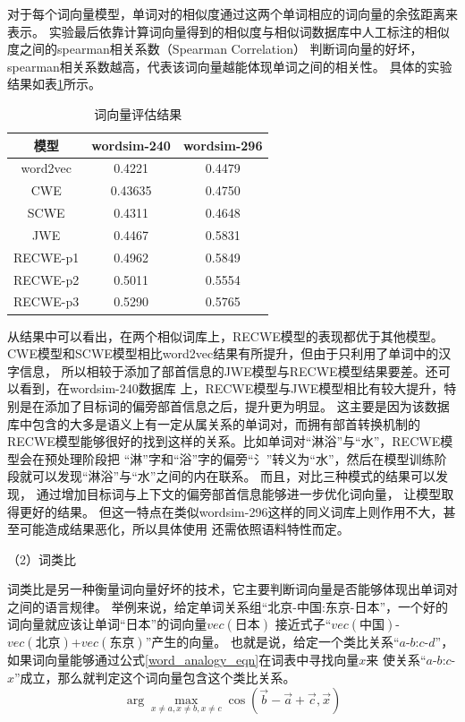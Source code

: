 对于每个词向量模型，单词对的相似度通过这两个单词相应的词向量的余弦距离来表示。
实验最后依靠计算词向量得到的相似度与相似词数据库中人工标注的相似度之间的spearman相关系数（Spearman Correlation）
判断词向量的好坏，spearman相关系数越高，代表该词向量越能体现单词之间的相关性。
具体的实验结果如表\ref{word_vec_result}所示。
\begin{table}[ht]
    \caption{词向量评估结果}
    \begin{tabular}{|c|c|c|}
        \hline
        模型 & wordsim-240 & wordsim-296 \\
        \hline
        word2vec & 0.4221 & 0.4479 \\
        \hline
        CWE & 0.43635 & 0.4750 \\
        \hline
        SCWE & 0.4311 & 0.4648 \\
        \hline
        JWE & 0.4467 & 0.5831 \\
        \hline
        RECWE-p1 & 0.4962 & 0.5849 \\
        \hline
        RECWE-p2 & 0.5011 & 0.5554 \\
        \hline
        RECWE-p3 & 0.5290 & 0.5765 \\
        \hline
    \end{tabular}
    \label{word_vec_result}
    \end{table}

从结果中可以看出，在两个相似词库上，RECWE模型的表现都优于其他模型。
CWE模型和SCWE模型相比word2vec结果有所提升，但由于只利用了单词中的汉字信息，
所以相较于添加了部首信息的JWE模型与RECWE模型结果要差。还可以看到，在wordsim-240数据库
上，RECWE模型与JWE模型相比有较大提升，特别是在添加了目标词的偏旁部首信息之后，提升更为明显。
这主要是因为该数据库中包含的大多是语义上有一定从属关系的单词对，而拥有部首转换机制的
RECWE模型能够很好的找到这样的关系。比如单词对“淋浴”与“水”，RECWE模型会在预处理阶段把
“淋”字和“浴”字的偏旁“氵”转义为“水”，然后在模型训练阶段就可以发现“淋浴”与“水”之间的内在联系。
而且，对比三种模式的结果可以发现，
通过增加目标词与上下文的偏旁部首信息能够进一步优化词向量，
让模型取得更好的结果。
但这一特点在类似wordsim-296这样的同义词库上则作用不大，甚至可能造成结果恶化，所以具体使用
还需依照语料特性而定。

（2）词类比

词类比是另一种衡量词向量好坏的技术，它主要判断词向量是否能够体现出单词对之间的语言规律。
举例来说，给定单词关系组“北京-中国:东京-日本”，一个好的词向量就应该让单词“日本”的词向量$vec\left(\mbox{日本}\right)$
接近式子“$vec\left(\mbox{中国}\right)$-$vec\left(\mbox{北京}\right)$+$vec\left(\mbox{东京}\right)$”产生的向量。
也就是说，给定一个类比关系“$a$-$b$:$c$-$d$”，如果词向量能够通过公式\ref{word_analogy_eqn}在词表中寻找向量$x$来
使关系“$a$-$b$:$c$-$x$”成立，那么就判定这个词向量包含这个类比关系。
\begin{equation}
    \arg \max_{x\neq a,x\neq b,x\neq c}\cos \left ( \vec{b}-\vec{a}+\vec{c},\vec{x} \right )
    \label{word_analogy_eqn}
\end{equation}

